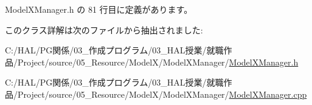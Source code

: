  Model\+X\+Manager.\+h の 81 行目に定義があります。



このクラス詳解は次のファイルから抽出されました\+:\begin{DoxyCompactItemize}
\item 
C\+:/\+H\+A\+L/\+P\+G関係/03\+\_\+作成プログラム/03\+\_\+\+H\+A\+L授業/就職作品/\+Project/source/05\+\_\+\+Resource/\+Model\+X/\+Model\+X\+Manager/\mbox{\hyperlink{_model_x_manager_8h}{Model\+X\+Manager.\+h}}\item 
C\+:/\+H\+A\+L/\+P\+G関係/03\+\_\+作成プログラム/03\+\_\+\+H\+A\+L授業/就職作品/\+Project/source/05\+\_\+\+Resource/\+Model\+X/\+Model\+X\+Manager/\mbox{\hyperlink{_model_x_manager_8cpp}{Model\+X\+Manager.\+cpp}}\end{DoxyCompactItemize}
